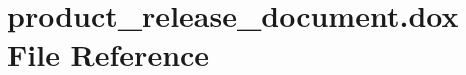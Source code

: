 \hypertarget{product__release__document_8dox}{}\section{product\+\_\+release\+\_\+document.\+dox File Reference}
\label{product__release__document_8dox}
